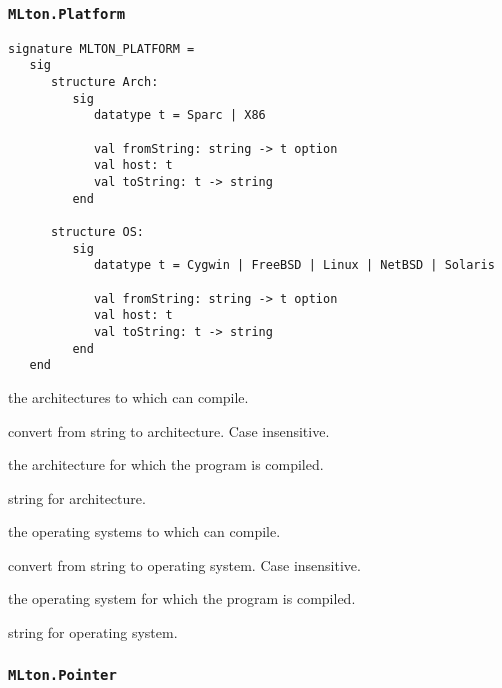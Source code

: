 \subsubsection{\tt MLton.Platform}

\begin{verbatim}
signature MLTON_PLATFORM =
   sig
      structure Arch:
         sig
            datatype t = Sparc | X86

            val fromString: string -> t option
            val host: t
            val toString: t -> string
         end
         
      structure OS:
         sig
            datatype t = Cygwin | FreeBSD | Linux | NetBSD | Solaris

            val fromString: string -> t option
            val host: t
            val toString: t -> string
         end
   end
\end{verbatim}

\begin{description}

the architectures to which {\mlton} can compile.

convert from string to architecture.  Case insensitive.

the architecture for which the program is compiled.

string for architecture.

the operating systems to which {\mlton} can compile.

convert from string to operating system.  Case insensitive.

the operating system for which the program is compiled.

string for operating system.

\end{description}
%
\subsubsection{\tt MLton.Pointer}

